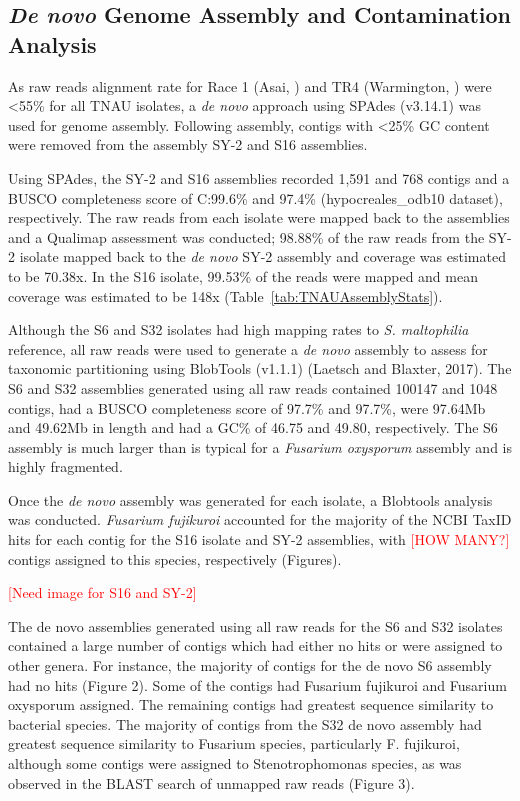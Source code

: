 

\subsection{\textit{De novo} Genome Assembly and Contamination Analysis}

As raw reads alignment rate for \Foc Race 1 (Asai, ) and \Foc TR4 (Warmington, ) were <55\% for all TNAU isolates, a \textit{de novo} approach using SPAdes (v3.14.1) was used for genome assembly. Following assembly, contigs with \textless 25\% GC content were removed from the assembly SY-2 and S16 assemblies.

Using SPAdes, the SY-2 and S16 assemblies recorded 1,591 and 768 contigs and a BUSCO completeness score of C:99.6\% and 97.4\% (hypocreales\_odb10 dataset), respectively. The raw reads from each isolate were mapped back to the assemblies and a Qualimap assessment was conducted; 98.88\% of the raw reads from the SY-2 isolate mapped back to the \textit{de novo} SY-2 assembly and coverage was estimated to be 70.38x. In the S16 isolate, 99.53\% of the reads were mapped and mean coverage was estimated to be 148x (Table~\ref{tab:TNAUAssemblyStats}).

Although the S6 and S32 isolates had high mapping rates to \textit{S. maltophilia} reference, all raw reads were used to generate a \textit{de novo} assembly to assess for taxonomic partitioning using BlobTools (v1.1.1) (Laetsch and Blaxter, 2017). The S6 and S32 assemblies generated using all raw reads contained 100147 and 1048 contigs, had a BUSCO completeness score of 97.7\% and 97.7\%, were 97.64Mb and 49.62Mb in length and had a GC\% of 46.75 and 49.80, respectively. The S6 assembly is much larger than is typical for a \textit{Fusarium oxysporum} assembly and is highly fragmented. 



Once the \textit{de novo} assembly was generated for each isolate, a Blobtools analysis was conducted. \textit{Fusarium fujikuroi} accounted for the majority of the NCBI TaxID hits for each contig for the S16 isolate and SY-2 assemblies, with \textcolor{red}{[HOW MANY?]} contigs assigned to this species, respectively (Figures). 

\textcolor{red}{[Need image for S16 and SY-2]}

The de novo assemblies generated using all raw reads for the S6 and S32 isolates contained a large number of contigs which had either no hits or were assigned to other genera. For instance, the majority of contigs for the de novo S6 assembly had no hits (Figure 2). Some of the contigs had Fusarium fujikuroi and Fusarium oxysporum assigned. The remaining contigs had greatest sequence similarity to bacterial species. The majority of contigs from the S32 de novo assembly had greatest sequence similarity to Fusarium species, particularly F. fujikuroi, although some contigs were assigned to Stenotrophomonas species, as was observed in the BLAST search of unmapped raw reads (Figure 3). 

